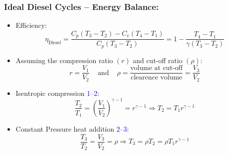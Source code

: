 \documentclass[10pt,compress]{beamer}
\begin{document}
\begin{frame}
 \frametitle{Ideal Diesel Cycles -- Energy Balance:}
 \begin{itemize}
  \item <1-> Efficiency: 
   \begin{displaymath}
    \eta_{\text{Diesel}}=\displaystyle\frac{C_{p}\left(T_{3}-T_{2}\right)-C_{v}\left(T_{4}-T_{1}\right)}{C_{p}\left(T_{3}-T_{2}\right)} = 1 - \displaystyle\frac{T_{4}-T_{1}}{\gamma\left(T_{3}-T_{2}\right)}
   \end{displaymath}
  \item <2-> Assuming the compression ratio $\left(r\right)$ and cut-off ratio $\left(\rho\right)$:
   \begin{displaymath}
    r=\displaystyle\frac{V_{1}}{V_{2}}\;\;\;\text{ and }\;\;\;\rho=\displaystyle\frac{\text{volume at cut-off}}{\text{clearence volume}}=\displaystyle\frac{V_{3}}{V_{2}}
   \end{displaymath}
  \item <3-> Isentropic compression \textcolor{blue}{1--2}:
   \begin{displaymath}
    \displaystyle\frac{T_{2}}{T_{1}}=\left(\displaystyle\frac{V_{1}}{V_{2}}\right)^{\gamma-1}=r^{\gamma-1} \Rightarrow T_{2}=T_{1}r^{\gamma-1}
   \end{displaymath}
  \item <4-> Constant Pressure heat addition \textcolor{blue}{2--3}: 
   \begin{displaymath}
    \displaystyle\frac{T_{3}}{T_{2}}=\displaystyle\frac{V_{3}}{V_{2}}=\rho \Rightarrow T_{3}=\rho T_{2}=\rho T_{1} r^{\gamma-1}
   \end{displaymath}
 \end{itemize}
\end{frame}
\end{document}
